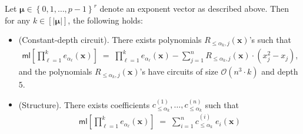 \documentclass[10pt,a4paper]{amsart}
\newcommand{\bigO}{\mathcal{O}}
\newcommand{\brac}[1]{\left[ #1 \right]}
\newcommand{\ml}{\mathsf{ml}}
\newcommand{\set}[1]{\left\{ #1 \right\}}
\begin{document}
\begin{claim}\label{claim:multilinearize-exponent-vector}
Let $\bm{\mu} \in \set{0,1,\ldots,p-1}^{r}$ denote an exponent vector as described above. Then for any $k \in [|\bm{\mu}|]$, the following holds:
\begin{itemize}
    \item (Constant-depth circuit). There exists polynomials $R_{\leq \alpha_{k}, j}(\mathbf{x})$'s such that
    \begin{align*}
        \ml\brac{\prod_{\ell = 1}^{k} e_{\alpha_{\ell}}(\mathbf{x})} \; = \; \prod_{\ell=1}^{k} e_{\alpha_{\ell}}(\mathbf{x}) - \sum_{j=1}^{n} R_{\leq \alpha_{k}, j}(\mathbf{x}) \cdot (x_{j}^{2} - x_{j}),
    \end{align*}
    and the polynomials $R_{\leq \alpha_{k}, j}(\mathbf{x})$'s have circuits of size $\bigO(n^{3} \cdot k)$ and depth $5$.
    \item (Structure). There exists coefficients $c_{\leq \alpha_{k}}^{(1)}, \ldots, c_{\leq \alpha_{k}}^{(n)}$ such that
    \begin{align*}
        \ml\brac{\prod_{\ell = 1}^{k} e_{\alpha_{\ell}}(\mathbf{x})} \; = \; \sum_{i=1}^{n} c_{\leq \alpha_{k}}^{(i)} \; e_{i}(\mathbf{x})
    \end{align*}
\end{itemize}
\end{claim}
\end{document}
